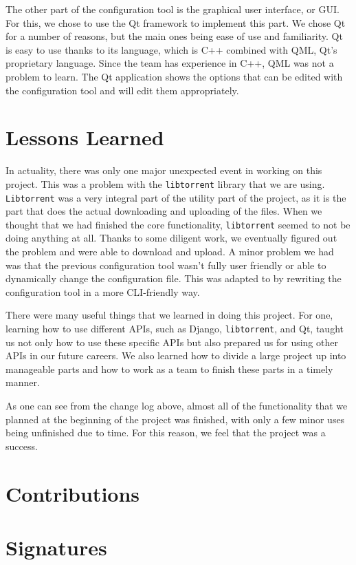 \documentclass[12 pt]{article}
\begin{document}
	The other part of the configuration tool is the graphical user interface, or GUI. For this, we chose to use the Qt framework to implement this part. We chose Qt for a number of reasons, but the main ones being ease of use and familiarity. Qt is easy to use thanks to its language, which is C++ combined with QML, Qt's proprietary language. Since the team has experience in C++, QML was not a problem to learn. The Qt application shows the options that can be edited with the configuration tool and will edit them appropriately.
	
	\section{Lessons Learned}
	
	In actuality, there was only one major unexpected event in working on this project. This was a problem with the \texttt{libtorrent} library that we are using. \texttt{Libtorrent} was a very integral part of the utility part of the project, as it is the part that does the actual downloading and uploading of the files. When we thought that we had finished the core functionality, \texttt{libtorrent} seemed to not be doing anything at all. Thanks to some diligent work, we eventually figured out the problem and were able to download and upload. A minor problem we had was that the previous configuration tool wasn't fully user friendly or able to dynamically change the configuration file. This was adapted to by rewriting the configuration tool in a more CLI-friendly way.
	
	There were many useful things that we learned in doing this project. For one, learning how to use different APIs, such as Django, \texttt{libtorrent}, and Qt, taught us not only how to use these specific APIs but also prepared us for using other APIs in our future careers. We also learned how to divide a large project up into manageable parts and how to work as a team to finish these parts in a timely manner.
	
	As one can see from the change log above, almost all of the functionality that we planned at the beginning of the project was finished, with only a few minor uses being unfinished due to time. For this reason, we feel that the project was a success.
	
	\section{Contributions}
	
	\section{Signatures}
\end{document}
